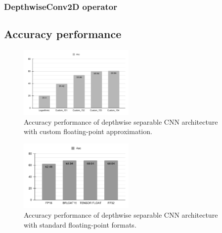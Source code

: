 \subsubsection{DepthwiseConv2D operator}
\subsection{Accuracy performance}


\begin{figure}[t!]
	\centering
	\includegraphics[width=0.5\textwidth]{../figures/acc_depthwise_cifar_custom.pdf}
	\caption{Accuracy performance of depthwise separable CNN architecture with custom floating-point approximation.}
	\label{fig:acc_custom}
\end{figure}

\begin{figure}[t!]
	\centering
	\includegraphics[width=0.5\textwidth]{../figures/acc_depthwise_cifar_standard.pdf}
	\caption{Accuracy performance of depthwise separable CNN architecture with standard floating-point formats.}
	\label{fig:acc_standard}
\end{figure}